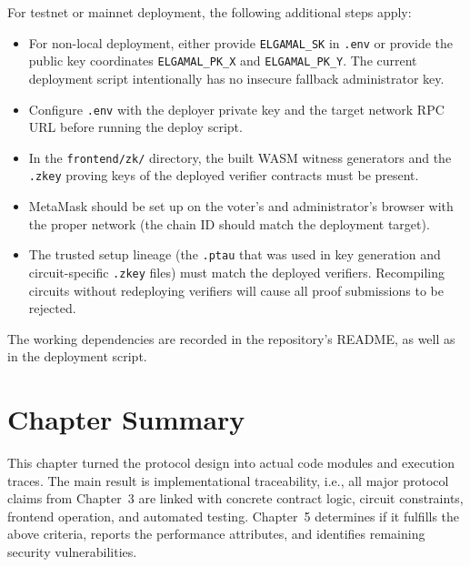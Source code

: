 For testnet or mainnet deployment, the following additional steps apply:
\begin{itemize}
    \item For non-local deployment, either provide \texttt{ELGAMAL\_SK} in \texttt{.env} or provide the public key coordinates \texttt{ELGAMAL\_PK\_X} and \texttt{ELGAMAL\_PK\_Y}. The current deployment script intentionally has no insecure fallback administrator key.
    \item Configure \texttt{.env} with the deployer private key and the target network RPC URL before running the deploy script.
    \item In the \texttt{frontend/zk/} directory, the built WASM witness generators and the \texttt{.zkey} proving keys of the deployed verifier contracts must be present.
    \item MetaMask should be set up on the voter's and administrator's browser with the proper network (the chain ID should match the deployment target).
    \item The trusted setup lineage (the \texttt{.ptau} that was used in key generation and circuit-specific \texttt{.zkey} files) must match the deployed verifiers. Recompiling circuits without redeploying verifiers will cause all proof submissions to be rejected.
\end{itemize}

The working dependencies are recorded in the repository's README, as well as in the deployment script.

\section{Chapter Summary}

This chapter turned the protocol design into actual code modules and execution traces. The main result is implementational traceability, i.e., all major protocol claims from Chapter~3 are linked with concrete contract logic, circuit constraints, frontend operation, and automated testing. Chapter~5 determines if it fulfills the above criteria, reports the performance attributes, and identifies remaining security vulnerabilities.

\endgroup


